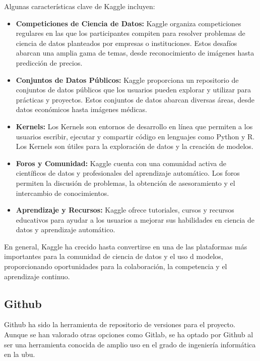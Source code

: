 Algunas características clave de Kaggle incluyen:
\begin{itemize}
\item \textbf{Competiciones de Ciencia de Datos:} Kaggle organiza competiciones regulares en las que los participantes compiten para resolver problemas de ciencia de datos planteados por empresas o instituciones. Estos desafíos abarcan una amplia gama de temas, desde reconocimiento de imágenes hasta predicción de precios.

\item \textbf{Conjuntos de Datos Públicos:} Kaggle proporciona un repositorio de conjuntos de datos públicos que los usuarios pueden explorar y utilizar para prácticas y proyectos. Estos conjuntos de datos abarcan diversas áreas, desde datos económicos hasta imágenes médicas.

\item \textbf{Kernels:} Los Kernels son entornos de desarrollo en línea que permiten a los usuarios escribir, ejecutar y compartir código en lenguajes como Python y R. Los Kernels son útiles para la exploración de datos y la creación de modelos.

\item \textbf{Foros y Comunidad:} Kaggle cuenta con una comunidad activa de científicos de datos y profesionales del aprendizaje automático. Los foros permiten la discusión de problemas, la obtención de asesoramiento y el intercambio de conocimientos.

\item \textbf{Aprendizaje y Recursos:} Kaggle ofrece tutoriales, cursos y recursos educativos para ayudar a los usuarios a mejorar sus habilidades en ciencia de datos y aprendizaje automático.
\end{itemize}

En general, Kaggle ha crecido hasta convertirse en una de las plataformas más importantes para la comunidad de ciencia de datos y el uso d modelos, proporcionando oportunidades para la colaboración, la competencia y el aprendizaje continuo.

\subsection{Github}

Github ha sido la herramienta de repositorio de versiones para el proyecto. Aunque se han valorado otras opciones como Gitlab, se ha optado por Github al ser una herramienta conocida de amplio uso en el grado de ingeniería informática en la \acrshort{ubu}.

